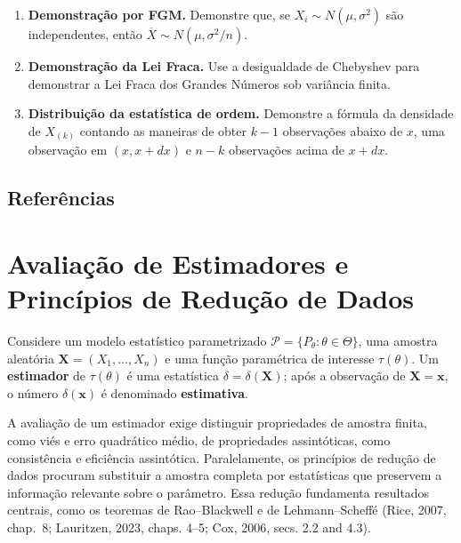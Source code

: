 \documentclass[
  letterpaper,
  DIV=11,
  numbers=noendperiod]{scrreprt}
\begin{document}
\begin{enumerate}
\def\labelenumi{\arabic{enumi}.}
\setcounter{enumi}{19}
\item
  \textbf{Demonstração por FGM.} Demonstre que, se
  \(X_i\sim N(\mu,\sigma^2)\) são independentes, então
  \(\overline{X}\sim N(\mu,\sigma^2/n)\).
\item
  \textbf{Demonstração da Lei Fraca.} Use a desigualdade de Chebyshev
  para demonstrar a Lei Fraca dos Grandes Números sob variância finita.
\item
  \textbf{Distribuição da estatística de ordem.} Demonstre a fórmula da
  densidade de \(X_{(k)}\) contando as maneiras de obter \(k-1\)
  observações abaixo de \(x\), uma observação em \((x,x+dx)\) e \(n-k\)
  observações acima de \(x+dx\).
\end{enumerate}

\section*{Referências}\label{referuxeancias-1}



\chapter{Avaliação de Estimadores e Princípios de Redução de
Dados}\label{avaliauxe7uxe3o-de-estimadores-e-princuxedpios-de-reduuxe7uxe3o-de-dados}

Considere um modelo estatístico parametrizado
\(\mathcal{P}=\{P_\theta:\theta\in\Theta\}\), uma amostra aleatória
\(\mathbf{X}=(X_1,\ldots,X_n)\) e uma função paramétrica de interesse
\(\tau(\theta)\). Um \textbf{estimador} de \(\tau(\theta)\) é uma
estatística \(\delta=\delta(\mathbf{X})\); após a observação de
\(\mathbf{X}=\mathbf{x}\), o número \(\delta(\mathbf{x})\) é denominado
\textbf{estimativa}.

A avaliação de um estimador exige distinguir propriedades de amostra
finita, como viés e erro quadrático médio, de propriedades assintóticas,
como consistência e eficiência assintótica. Paralelamente, os princípios
de redução de dados procuram substituir a amostra completa por
estatísticas que preservem a informação relevante sobre o parâmetro.
Essa redução fundamenta resultados centrais, como os teoremas de
Rao--Blackwell e de Lehmann--Scheffé (Rice, 2007, chap.~8; Lauritzen,
2023, chaps. 4--5; Cox, 2006, secs. 2.2 and 4.3).
\end{document}
